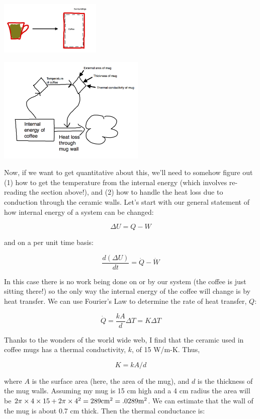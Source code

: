 \beforefig
\centerline{\includegraphics[height=1in]{figs/coffeeabstraction.png}}
\centerline{\includegraphics[height=2in]{figs/coffeestockandflow.png}}
\afterfig

Now, if we want to get quantitative about this, we'll need to somehow figure out (1) how to get the temperature from the internal energy (which involves re-reading the section above!), and (2) how to handle the heat loss due to conduction through the ceramic walls. Let's start with our general statement of how internal energy of a system can be changed:

$$\Delta U = Q - W$$

and on a per unit time basis:

$$\frac{d(\Delta U)}{dt} = \dot{Q} - \dot{W}$$

In this case there is no work being done on or by our system (the coffee is just sitting there!) so the only way the internal energy of the coffee will change is by heat transfer. We can use Fourier's Law to determine the rate of  heat transfer, $Q$:

$$\dot{Q} = \frac{kA}{d}\Delta T = K\Delta T$$

Thanks to the wonders of the world wide web, I find that the ceramic used in coffee mugs has a thermal conductivity, $k$, of 15 W/m-K.  Thus,

$$K = k A/d$$

where $A$ is the surface area (here, the area of the mug), and $d$ is the thickness of the mug walls.  Assuming my mug is 15 cm high and a 4 cm radius the area will be $2\pi \times 4 \times 15+2\pi \times 4^{2}=289 \textup{cm}^{2}=.0289\textup{m}^{2}$. We can estimate that the wall of the mug is about 0.7 cm thick. Then the thermal conductance is:

